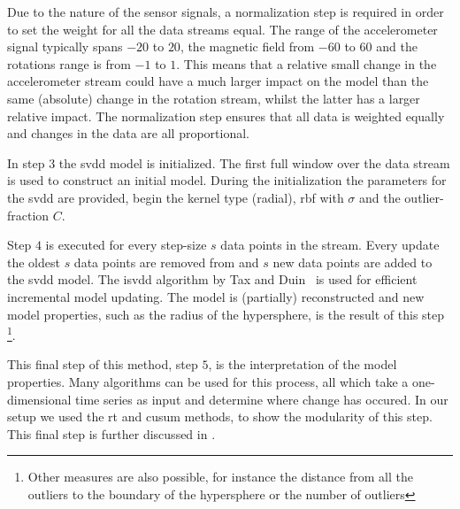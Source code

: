 Due to the nature of the sensor signals, a normalization step is required in order to set the weight for all the data streams equal.
The range of the accelerometer signal typically spans $-20$ to $20$, the magnetic field from $-60$ to $60$ and the rotations range is from $-1$ to $1$.
This means that a relative small change in the accelerometer stream could have a much larger impact on the model than the same (absolute) change in the rotation stream, whilst the latter has a larger relative impact.
The normalization step ensures that all data is weighted equally and changes in the data are all proportional.

In step $3$ the \gls{svdd} model is initialized.
The first full window over the data stream is used to construct an initial model.
During the initialization the parameters for the \gls{svdd} are provided, begin the kernel type (radial), \gls{rbf} with $\sigma$ and the outlier-fraction $C$.

Step $4$ is executed for every step-size $s$ data points in the stream.
Every update the oldest $s$ data points are removed from and $s$ new data points are added to the \gls{svdd} model.
The \gls{isvdd} algorithm by Tax and Duin~\cite{tax2002uniform} is used for efficient incremental model updating.
The model is (partially) reconstructed and new model properties, such as the radius of the hypersphere, is the result of this step \footnote{Other measures are also possible, for instance the distance from all the outliers to the boundary of the hypersphere or the number of outliers}.

This final step of this method, step $5$, is the interpretation of the model properties.
Many algorithms can be used for this process, all which take a one-dimensional time series as input and determine where change has occured.
In our setup we used the \gls{rt} and \gls{cusum} methods, to show the modularity of this step.
This final step is further discussed in .